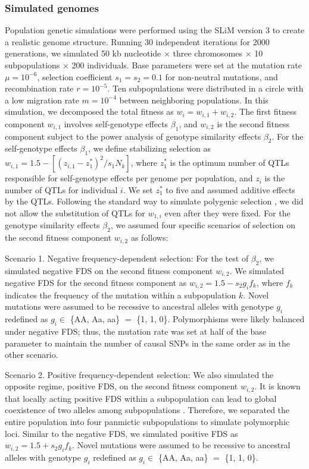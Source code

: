 \documentclass[12pt,]{article}
\begin{document}
\subsubsection{Simulated genomes}
Population genetic simulations were performed using the SLiM version 3 to create a realistic genome structure. Running 30 independent iterations for 2000 generations, we simulated 50 kb nucleotide $\times$ three chromosomes $\times$ 10 subpopulations $\times$ 200 individuals. Base parameters were set at the mutation rate $\mu = 10^{-6}$, selection coefficient $s_1=s_2=0.1$ for non-neutral mutations, and recombination rate $r=10^{-5}$. Ten subpopulations were distributed in a circle with a low migration rate $m=10^{-4}$ between neighboring populations. In this simulation, we decomposed the total fitness as $w_i = w_{i,1} + w_{i,2}$. The first fitness component $w_{i,1}$ involves self-genotype effects $\beta_1$, and $w_{i,2}$ is the second fitness component subject to the power analysis of genotype similarity effects $\beta_2$. For the self-genotype effects $\beta_1$, we define stabilizing selection as $w_{i,1} = 1.5 - [(z_{i,1} - z_1^*)^2 / s_1N_k]$, where $z_1^*$ is the optimum number of QTLs responsible for self-genotype effects per genome per population, and $z_i$ is the number of QTLs for individual $i$. We set $z_1^*$ to five and assumed additive effects by the QTLs. Following the standard way to simulate polygenic selection \citep{haller_slim_2019}, we did not allow the substitution of QTLs for $w_{1,i}$ even after they were fixed. For the genotype similarity effects $\beta_2$, we assumed four specific scenarios of selection on the second fitness component $w_{i,2}$ as follows: 

Scenario 1. Negative frequency-dependent selection: For the test of $\beta_2$, we simulated negative FDS on the second fitness component $w_{i,2}$. We simulated negative FDS for the second fitness component as $w_{i,2} = 1.5 - s_ 2 g _if_k$, where $f_k$ indicates the frequency of the mutation within a subpopulation $k$. Novel mutations were assumed to be recessive to ancestral alleles with genotype $g_i$ redefined as $g_i \in$ \{AA, Aa, aa\} $=$ \{1, 1, 0\}. Polymorphisms were likely balanced under negative FDS; thus, the mutation rate was set at half of the base parameter to maintain the number of causal SNPs in the same order as in the other scenario.

Scenario 2. Positive frequency-dependent selection: We also simulated the opposite regime, positive FDS, on the second fitness component $w_{i,2}$. It is known that locally acting positive FDS within a subpopulation can lead to global coexistence of two alleles among subpopulations \citep{molofsky2001coexistence}. Therefore, we separated the entire population into four panmictic subpopulations to simulate polymorphic loci. Similar to the negative FDS, we simulated positive FDS as $w_{i,2} = 1.5 + s_ 2 g _if_k$. Novel mutations were assumed to be recessive to ancestral alleles with genotype $g_i$ redefined as $g_i \in$ \{AA, Aa, aa\} $=$ \{1, 1, 0\}. 
\end{document}
